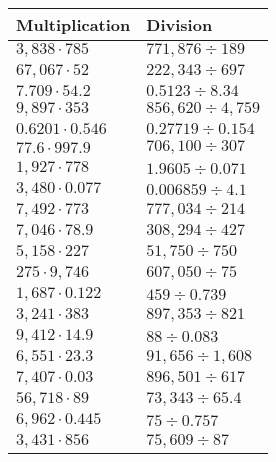 \begin{longtable}[]{@{}ll@{}}
\toprule
Multiplication & Division\tabularnewline
\midrule
\endhead
\(3,838\cdot785\) & \(771,876÷189\)\tabularnewline
\(67,067\cdot52\) & \(222,343÷697\)\tabularnewline
\(7.709\cdot54.2\) & \(0.5123÷8.34\)\tabularnewline
\(9,897\cdot353\) & \(856,620÷4,759\)\tabularnewline
\(0.6201\cdot0.546\) & \(0.27719÷0.154\)\tabularnewline
\(77.6\cdot997.9\) & \(706,100÷307\)\tabularnewline
\(1,927\cdot778\) & \(1.9605÷0.071\)\tabularnewline
\(3,480\cdot0.077\) & \(0.006859÷4.1\)\tabularnewline
\(7,492\cdot773\) & \(777,034÷214\)\tabularnewline
\(7,046\cdot78.9\) & \(308,294÷427\)\tabularnewline
\(5,158\cdot227\) & \(51,750÷750\)\tabularnewline
\(275\cdot9,746\) & \(607,050÷75\)\tabularnewline
\(1,687\cdot0.122\) & \(459÷0.739\)\tabularnewline
\(3,241\cdot383\) & \(897,353÷821\)\tabularnewline
\(9,412\cdot14.9\) & \(88÷0.083\)\tabularnewline
\(6,551\cdot23.3\) & \(91,656÷1,608\)\tabularnewline
\(7,407\cdot0.03\) & \(896,501÷617\)\tabularnewline
\(56,718\cdot89\) & \(73,343÷65.4\)\tabularnewline
\(6,962\cdot0.445\) & \(75÷0.757\)\tabularnewline
\(3,431\cdot856\) & \(75,609÷87\)\tabularnewline
\bottomrule
\end{longtable}
